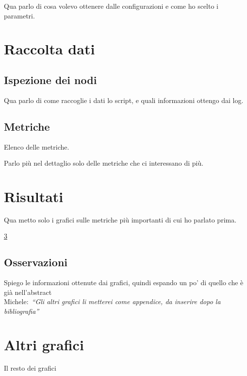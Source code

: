 \documentclass{article}
\newcommand{\michele}[1]{{\color{red}Michele:~}{\itshape``{#1}''}}
\begin{document}
Qua parlo di cosa volevo ottenere dalle configurazioni e come ho scelto i parametri.

\section{Raccolta dati}

\subsection{Ispezione dei nodi}

Qua parlo di come raccoglie i dati lo script, e quali informazioni ottengo dai log.

\subsection{Metriche}

Elenco delle metriche.

Parlo più nel dettaglio solo delle metriche che ci interessano di più.

\section{Risultati}

Qua metto solo i grafici sulle metriche più importanti di cui ho parlato prima.

\ref{appendix:grafici}

\subsection{Osservazioni}

Spiego le informazioni ottenute dai grafici, quindi espando un po' di quello che è già nell'abstract \\

\michele{Gli altri grafici li metterei come appendice, da inserire dopo la bibliografia}






\appendix

\section{Altri grafici}\label{appendix:grafici}

Il resto dei grafici
\end{document}
